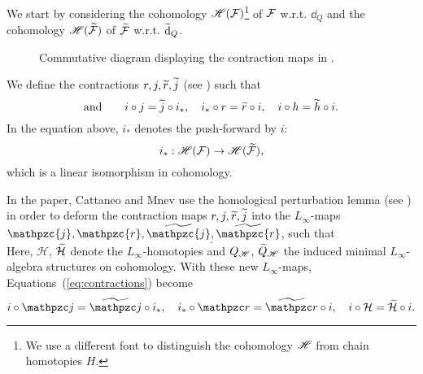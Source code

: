 We start by considering the cohomology $\mathscr{H}(\mathcal{F})$\footnote{We use a different font to distinguish the cohomology $\mathscr{H}$ from chain homotopies $H$.}
of $\mathcal{F}$ w.r.t. $\dd_Q$ and the cohomology $\mathscr{H}(\widetilde{\mathcal{F}})$ of $\widetilde{\mathcal{F}}$ w.r.t. $\widetilde{\dd}_Q$.
\begin{figure}
    \centering
    
    \caption{Commutative diagram displaying the contraction maps in .}
    \label{fig:contractions_diagram}
\end{figure}
We define the contractions $r, j, \widetilde{r}, \widetilde{j}$ (see ) such that
\begin{equation}
\label{eq:4.12}
    
\end{equation}
\begin{equation}
\label{eq:contractions}
    \text{and} \qquad
    i \circ j = \widetilde{j} \circ i_*, \quad
    i_* \circ r = \widetilde{r} \circ i, \quad
    i \circ h = \widetilde{h} \circ i .
\end{equation}
In the equation above, $i_*$ denotes the push-forward by $i$:
\begin{equation*}
    i_* : \mathscr{H}(\mathcal{F}) \rightarrow \mathscr{H}(\widetilde{\mathcal{F}}) ,
\end{equation*}
which is a linear isomorphism in cohomology.

In the paper, Cattaneo and Mnev use the homological perturbation lemma (see \cite[Section 6.4]{Hom_mirror_trasnfer_lemma}) in order to deform the contraction maps $r, j, \widetilde{r}, \widetilde{j}$ into the $L_\infty$-maps $\mathpzc{j}, \mathpzc{r}, \wt{\mathpzc{j}}, \wt{\mathpzc{r}}$, such that
\begin{equation}
     .
\end{equation}
Here, $\mathcal{H}$, $\widetilde{\mathcal{H}}$ denote the $L_\infty$-homotopies and $Q_{\mathscr{H}}$, $\widetilde{Q}_{\mathscr{H}}$ the induced minimal $L_\infty$-algebra structures on cohomology.
With these new $L_\infty$-maps, Equations~(\ref{eq:contractions}) become
\begin{equation}
    i \circ \cazz{j} = \wt{\cazz{j}} \circ i_*, \quad
    i_* \circ \cazz{r} = \wt{\cazz{r}} \circ i, \quad
    i \circ \mc{H} = \wt{\mc{H}} \circ i .
\end{equation}

